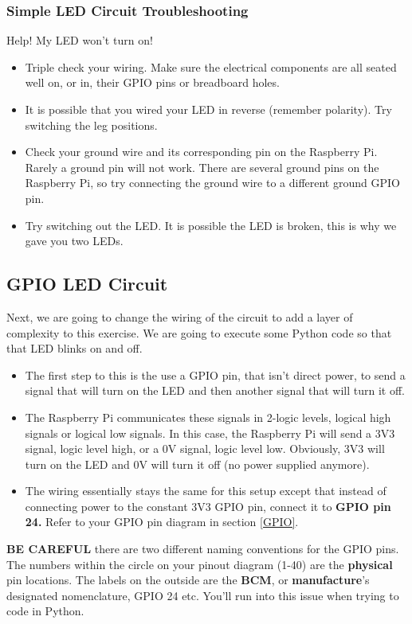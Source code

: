\documentclass{article}\usepackage[]{graphicx}\usepackage[]{color}
\begin{document}
\subsubsection{Simple LED Circuit Troubleshooting}
Help! My LED won't turn on!
\begin{itemize}
\item Triple check your wiring. Make sure the electrical components are all seated well on, or in, their GPIO pins or breadboard holes.
\item It is possible that you wired your LED in reverse (remember polarity). Try switching the leg positions.
\item Check your ground wire and its corresponding pin on the Raspberry Pi. Rarely a ground pin will not work. There are several ground pins on the Raspberry Pi, so try connecting the ground wire to a different ground GPIO pin.
\item Try switching out the LED. It is possible the LED is broken, this is why we gave you two LEDs.
\end{itemize}

\subsection{GPIO LED Circuit}
Next, we are going to change the wiring of the circuit to add a layer of complexity to this exercise. We are going to execute some Python code so that that LED blinks on and off.
\begin{itemize}
\item The first step to this is the use a GPIO pin, that isn't direct power, to send a signal that will turn on the LED and then another signal that will turn it off.
\item The Raspberry Pi communicates these signals in 2-logic levels, logical high signals or logical low signals. In this case, the Raspberry Pi will send a 3V3 signal, logic level high, or a 0V signal, logic level low. Obviously, 3V3 will turn on the LED and 0V will turn it off (no power supplied anymore).
\item The wiring essentially stays the same for this setup except that instead of connecting power to the constant 3V3 GPIO pin, connect it to \textbf{GPIO pin 24.} Refer to your GPIO pin diagram in section \ref{GPIO}.
\end{itemize}
\textbf{BE CAREFUL} there are two different naming conventions for the GPIO pins. The numbers within the circle on your pinout diagram (1-40) are the \textbf{physical} pin locations. The labels on the outside are the \textbf{BCM}, or \textbf{manufacture}'s designated nomenclature, GPIO 24 etc. You'll run into this issue when trying to code in Python. \label{GPIO24}
\end{document}
